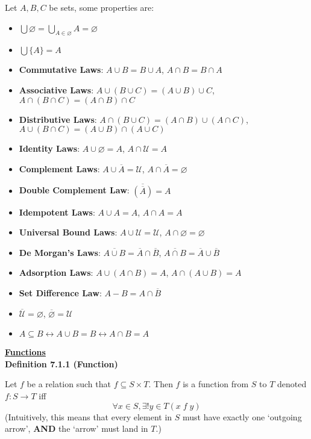 \documentclass[a4paper]{article}
\newcommand{\heading}[1]{{\small\underline{\textbf{#1}}}}
\newcommand{\subheading}[1]{{\scriptsize\textbf{#1}}}
\begin{document}
\begin{multicols*}{4}
Let $A, B, C$ be sets, some properties are:
\begin{itemize}[leftmargin=*] \itemsep -0.3em
	\item $\bigcup \varnothing = \bigcup_{A \in \varnothing} A = \varnothing$
	\item $\bigcup \{A\} = A$
	\item \textbf{Commutative Laws}: $A \cup B = B \cup A$, $A \cap B = B \cap A$
	\item \textbf{Associative Laws}: $A \cup (B \cup C) = (A \cup B) \cup C$, $A \cap (B \cap C) = (A \cap B) \cap C$
	\item \textbf{Distributive Laws}: $A \cap (B \cup C) = (A \cap B) \cup (A \cap C)$, $A \cup (B \cap C) = (A \cup B) \cap (A \cup C)$
	\item \textbf{Identity Laws}: $A \cup \varnothing = A$,  $A \cap \mathcal{U} = A$
	\item \textbf{Complement Laws}: $A \cup \overline{A} = \mathcal{U}$, $A \cap \overline{A} = \varnothing$
	\item \textbf{Double Complement Law}: $\overline{(\overline{A})} = A$
	\item \textbf{Idempotent Laws}: $A \cup A = A$, $A \cap A = A$
	\item \textbf{Universal Bound Laws}: $A \cup \mathcal{U} = \mathcal{U}$, $A \cap \varnothing = \varnothing$
	\item \textbf{De Morgan's Laws}: $\overline{A \cup B} = \overline{A} \cap \overline{B}$, $\overline{A \cap B} = \overline{A} \cup \overline{B}$
	\item \textbf{Adsorption Laws}: $A \cup (A \cap B) = A$, $A \cap (A \cup B) = A$
	\item \textbf{Set Difference Law}: $A - B = A \cap \overline{B}$
	\item $\overline{\mathcal{U}} = \varnothing$, $\overline{\varnothing} = \mathcal{U}$
	\item $A \subseteq B \leftrightarrow A \cup B = B \leftrightarrow A \cap B = A$
\end{itemize}


\heading{Functions} \\

\subheading{Definition 7.1.1 (Function)}

Let $f$ be a relation such that $f \subseteq S \times T$. Then $f$ is a function
from $S$ to $T$ denoted $f: S\rightarrow T$ iff
$$\forall x \in S, \exists! y \in T(x\;f\;y)$$
(Intuitively, this means that every element in $S$ must have exactly one
`outgoing arrow', \textbf{AND} the `arrow' must land in $T$.)\\


\end{multicols*}
\end{document}
